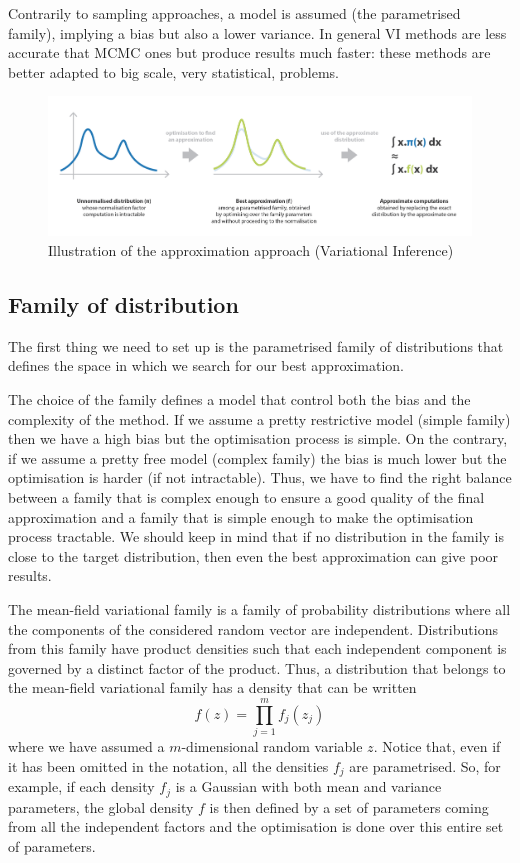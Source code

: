 Contrarily to sampling approaches, a model is assumed (the parametrised family), implying a bias but also a lower variance. In general VI methods are less accurate that MCMC ones but produce results much faster: these methods are better adapted to big scale, very statistical, problems.


\begin{figure}[h]
    \centering
\includegraphics[width=\textwidth]{pic/p05c07-snip06.png}
    \caption{Illustration of the approximation approach (Variational Inference)}
    \label{fig:p05c07-snip06}
\end{figure}

\subsection{Family of distribution}

The first thing we need to set up is the parametrised family of distributions that defines the space in which we search for our best approximation.

The choice of the family defines a model that control both the bias and the complexity of the method. If we assume a pretty restrictive model (simple family) then we have a high bias but the optimisation process is simple. On the contrary, if we assume a pretty free model (complex family) the bias is much lower but the optimisation is harder (if not intractable). Thus, we have to find the right balance between a family that is complex enough to ensure a good quality of the final approximation and a family that is simple enough to make the optimisation process tractable. We should keep in mind that if no distribution in the family is close to the target distribution, then even the best approximation can give poor results.

The mean-field variational family is a family of probability distributions where all the components of the considered random vector are independent. Distributions from this family have product densities such that each independent component is governed by a distinct factor of the product. Thus, a distribution that belongs to the mean-field variational family has a density that can be written
\begin{equation}f(z)=\prod_{j=1}^{m} f_{j}\left(z_{j}\right)\end{equation}
where we have assumed a $m$-dimensional random variable $z$. Notice that, even if it has been omitted in the notation, all the densities $f_j$ are parametrised. So, for example, if each density $f_j$ is a Gaussian with both mean and variance parameters, the global density $f$ is then defined by a set of parameters coming from all the independent factors and the optimisation is done over this entire set of parameters.


